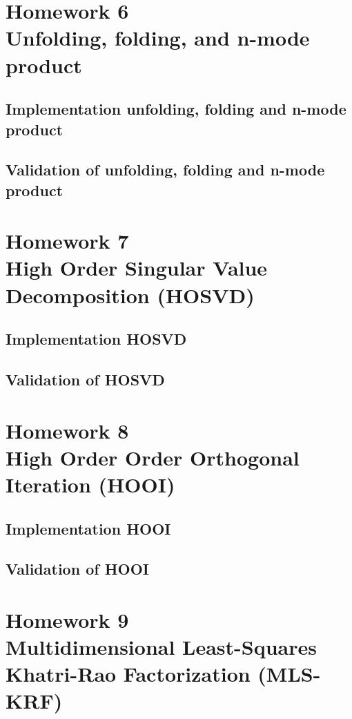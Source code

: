 \documentclass[a4paper,10pt]{article}
\begin{document}
\newpage
\section*{Homework 6 \\ Unfolding, folding, and n-mode product}

    \subsection*{Implementation unfolding, folding and n-mode product}

    \subsection*{Validation of unfolding, folding and n-mode product}

\newpage
\section*{Homework 7 \\ High Order Singular Value Decomposition (HOSVD)}

    \subsection*{Implementation HOSVD}

    \subsection*{Validation of HOSVD}

\newpage
\section*{Homework 8 \\ High Order Order Orthogonal Iteration (HOOI)}

    \subsection*{Implementation HOOI}

    \subsection*{Validation of HOOI}

\newpage
\section*{Homework 9 \\ Multidimensional Least-Squares Khatri-Rao Factorization
(MLS-KRF)}
\end{document}
